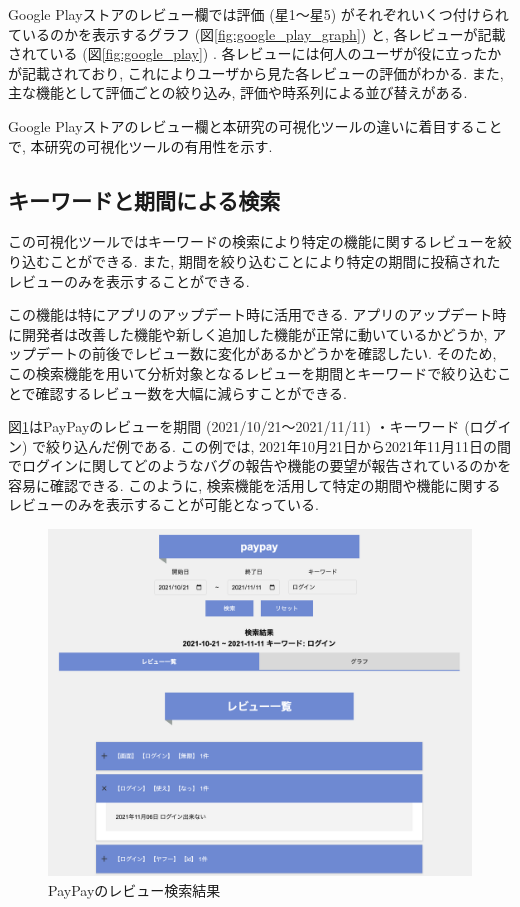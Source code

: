 Google Playストアのレビュー欄では評価 (星1〜星5) がそれぞれいくつ付けられているのかを表示するグラフ (図\ref{fig:google_play_graph}) と, 各レビューが記載されている (図\ref{fig:google_play}) . 各レビューには何人のユーザが役に立ったかが記載されており, これによりユーザから見た各レビューの評価がわかる. 
また, 主な機能として評価ごとの絞り込み, 評価や時系列による並び替えがある. 

Google Playストアのレビュー欄と本研究の可視化ツールの違いに着目することで, 本研究の可視化ツールの有用性を示す. 

\subsection{キーワードと期間による検索}
この可視化ツールではキーワードの検索により特定の機能に関するレビューを絞り込むことができる. また, 期間を絞り込むことにより特定の期間に投稿されたレビューのみを表示することができる.  

この機能は特にアプリのアップデート時に活用できる. アプリのアップデート時に開発者は改善した機能や新しく追加した機能が正常に動いているかどうか, アップデートの前後でレビュー数に変化があるかどうかを確認したい. そのため, この検索機能を用いて分析対象となるレビューを期間とキーワードで絞り込むことで確認するレビュー数を大幅に減らすことができる. 

図\ref{fig:paypay_search}はPayPayのレビューを期間 (2021/10/21〜2021/11/11) ・キーワード (ログイン) で絞り込んだ例である. 
この例では, 2021年10月21日から2021年11月11日の間でログインに関してどのようなバグの報告や機能の要望が報告されているのかを容易に確認できる. 
このように, 検索機能を活用して特定の期間や機能に関するレビューのみを表示することが可能となっている. 
\begin{figure}[H]
  \centering
  \includegraphics[scale=0.3]
    {contents/images/paypay_search.png}
  \caption{PayPayのレビュー検索結果\label{fig:paypay_search}}
\end{figure}

